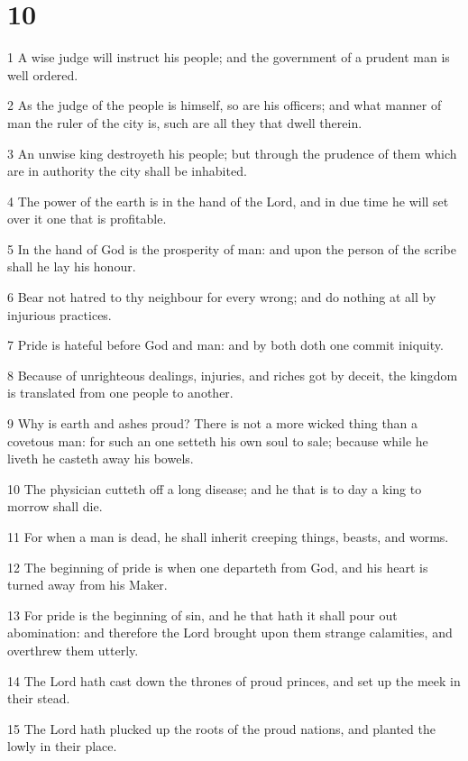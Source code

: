 \chapter{10}

\par 1 A wise judge will instruct his people; and the government of a prudent man is well ordered.
\par 2 As the judge of the people is himself, so are his officers; and what manner of man the ruler of the city is, such are all they that dwell therein.
\par 3 An unwise king destroyeth his people; but through the prudence of them which are in authority the city shall be inhabited.
\par 4 The power of the earth is in the hand of the Lord, and in due time he will set over it one that is profitable.
\par 5 In the hand of God is the prosperity of man: and upon the person of the scribe shall he lay his honour.
\par 6 Bear not hatred to thy neighbour for every wrong; and do nothing at all by injurious practices.
\par 7 Pride is hateful before God and man: and by both doth one commit iniquity.
\par 8 Because of unrighteous dealings, injuries, and riches got by deceit, the kingdom is translated from one people to another.
\par 9 Why is earth and ashes proud? There is not a more wicked thing than a covetous man: for such an one setteth his own soul to sale; because while he liveth he casteth away his bowels.
\par 10 The physician cutteth off a long disease; and he that is to day a king to morrow shall die.
\par 11 For when a man is dead, he shall inherit creeping things, beasts, and worms.
\par 12 The beginning of pride is when one departeth from God, and his heart is turned away from his Maker.
\par 13 For pride is the beginning of sin, and he that hath it shall pour out abomination: and therefore the Lord brought upon them strange calamities, and overthrew them utterly.
\par 14 The Lord hath cast down the thrones of proud princes, and set up the meek in their stead.
\par 15 The Lord hath plucked up the roots of the proud nations, and planted the lowly in their place.
